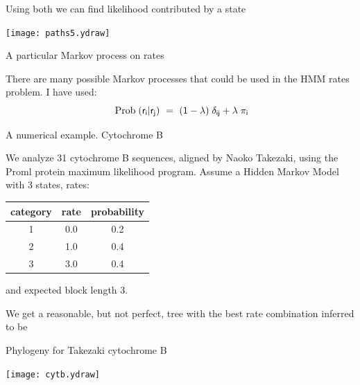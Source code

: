 \documentclass[bluish,slideColor,colorBG,pdf]{prosper}
\def\prob{{\rm \;Prob\;}}
\begin{document}
\begin{slide}[Replace]{Using both we can find likelihood contributed by a state}

\centerline{\texttt{[image: paths5.ydraw]}}

\end{slide}

\begin{slide}[Replace]{A particular Markov process on rates}

There are many possible Markov processes that could be used in the HMM
rates problem.  I have used:
\[
\mathsf{\prob(r_i | r_j)\ =\ (1-\lambda)\; \delta_{ij} + \lambda\; \pi_i}
\]

\end{slide}

\begin{slide}[Replace]{A numerical example. Cytochrome B}

We analyze 31 cytochrome B sequences, aligned by Naoko Takezaki,
using the Proml protein maximum likelihood program.  Assume a
Hidden Markov Model with 3 states, rates:
\bigskip

\begin{center}
\begin{tabular}{c c c}
category & rate & probability \\
\hline
1 &  0.0 & 0.2 \\
2 & 1.0 & 0.4 \\
3 &  3.0 & 0.4
\end{tabular}
\end{center}
\bigskip


and expected block length  3.
\bigskip

We get a reasonable, but not perfect, tree with the best rate combination inferred
to be

\end{slide}

\begin{slide}[Replace]{Phylogeny for Takezaki cytochrome B}

\centerline{\texttt{[image: cytb.ydraw]}}

\end{slide}
\end{document}
